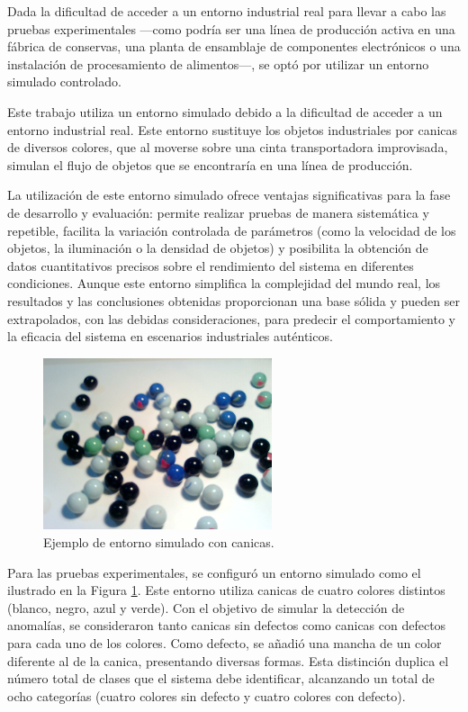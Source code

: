 \documentclass[11pt,spanish,listoffigures,listoftables]{tfgetsinf}
\begin{document}
Dada la dificultad de acceder a un entorno industrial real para llevar a cabo las pruebas experimentales —como podría ser una línea de producción activa en una fábrica de conservas, una planta de ensamblaje de componentes electrónicos o una instalación de procesamiento de alimentos—, se optó por utilizar un entorno simulado controlado. 

Este trabajo utiliza un entorno simulado debido a la dificultad de acceder a un entorno industrial real. Este entorno sustituye los objetos industriales por canicas de diversos colores, que al moverse sobre una cinta transportadora improvisada, simulan el flujo de objetos que se encontraría en una línea de producción.

La utilización de este entorno simulado ofrece ventajas significativas para la fase de desarrollo y evaluación: permite realizar pruebas de manera sistemática y repetible, facilita la variación controlada de parámetros (como la velocidad de los objetos, la iluminación o la densidad de objetos) y posibilita la obtención de datos cuantitativos precisos sobre el rendimiento del sistema en diferentes condiciones. Aunque este entorno simplifica la complejidad del mundo real, los resultados y las conclusiones obtenidas proporcionan una base sólida y pueden ser extrapolados, con las debidas consideraciones, para predecir el comportamiento y la eficacia del sistema en escenarios industriales auténticos.

\begin{figure}[H]
   \centering
   \includegraphics[width=0.6\textwidth]{images/diseno_e_implementacion/ejemplo_canicas.png}
   \caption[Ejemplo de entorno simulado con canicas]{Ejemplo de entorno simulado con canicas.}
   \label{fig:entorno_simulado}
\end{figure}

Para las pruebas experimentales, se configuró un entorno simulado como el ilustrado en la Figura \ref{fig:entorno_simulado}. Este entorno utiliza canicas de cuatro colores distintos (blanco, negro, azul y verde). Con el objetivo de simular la detección de anomalías, se consideraron tanto canicas sin defectos como canicas con defectos para cada uno de los colores. Como defecto, se añadió una mancha de un color diferente al de la canica, presentando diversas formas. Esta distinción duplica el número total de clases que el sistema debe identificar, alcanzando un total de ocho categorías (cuatro colores sin defecto y cuatro colores con defecto).
\end{document}
